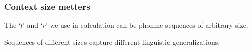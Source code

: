 
\begin{frame}
\frametitle{Context size metters}

\begin{item}
\item The `$l$' and `$r$' we use in calculation can be phonme 
      sequences of arbitrary size.
\item Sequences of different sizes capture different linguistic
      generalizations.
\end{item}

\end{frame}
